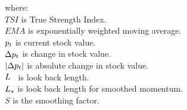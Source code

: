 \documentclass{article}
\begin{document}
where: \\

$TSI$ is True Strength Index. \\

$EMA$ is exponentially weighted moving average. \\

$p_{t}$ is current stock value. \\

$\Delta p_{t}$ is change in stock value. \\

$|\Delta p_{t}|$ is absolute change in stock value. \\

$L$ \ is look back length. \\

$L_{s}$ is look back length for smoothed momentum. \\

$S$ is the smoothing factor.

\hspace{200mm}
\hspace{200mm}
\keyterms
\furtherlinks
\end{document}
